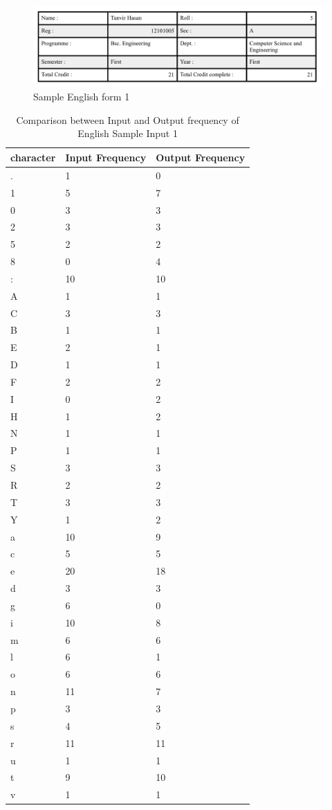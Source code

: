 \begin{figure}[H]
\centering
\includegraphics[width=1\textwidth]{form1.png}
\caption {Sample English form 1}
\label {fig:form1}
\end{figure}

\begin{table}[H]
\centering
\begin{tabular}{|p{2cm}|p{2cm}|p{2cm}|}
\hline
character & Input Frequency & Output Frequency \\
\hline
. & 1 & 0\\
\hline
1 & 5 & 7\\
\hline
0 & 3 & 3\\
\hline
2 & 3 & 3\\
\hline
5 & 2 & 2\\
\hline
8 & 0 & 4\\
\hline
: & 10 & 10\\
\hline
A & 1 & 1\\
\hline
C & 3 & 3\\
\hline
B & 1 & 1\\
\hline
E & 2 & 1\\
\hline
D & 1 & 1\\
\hline
F & 2 & 2\\
\hline
I & 0 & 2\\
\hline
H & 1 & 2\\
\hline
N & 1 & 1\\
\hline
P & 1 & 1\\
\hline
S & 3 & 3\\
\hline
R & 2 & 2\\
\hline
T & 3 & 3\\
\hline
Y & 1 & 2\\
\hline
a & 10 & 9\\
\hline
c & 5 & 5\\
\hline
e & 20 & 18\\
\hline
d & 3 & 3\\
\hline
g & 6 & 0\\
\hline
i & 10 & 8\\
\hline
m & 6 & 6\\
\hline
l & 6 & 1\\
\hline
o & 6 & 6\\
\hline
n & 11 & 7\\
\hline
p & 3 & 3\\
\hline
s & 4 & 5\\
\hline
r & 11 & 11\\
\hline
u & 1 & 1\\
\hline
t & 9 & 10\\
\hline
v & 1 & 1\\
\hline
\end{tabular}
\caption { Comparison between Input and Output frequency of English Sample Input 1}
\label {tab:Table1}
\end{table}

